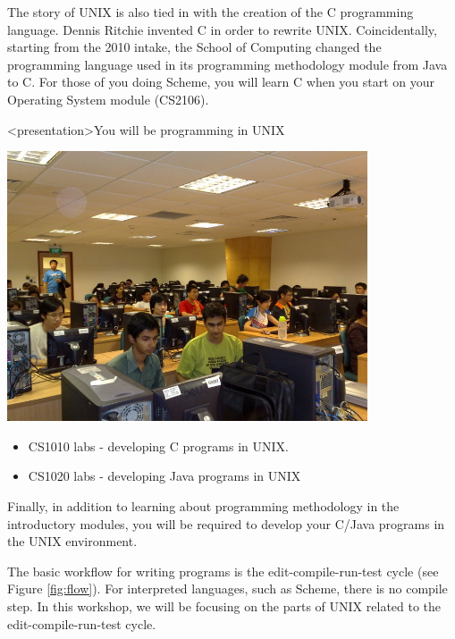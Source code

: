 The story of UNIX is also tied in with the creation of the C programming
language.  Dennis Ritchie invented C in order to rewrite UNIX. Coincidentally,
starting from the 2010 intake, the School of Computing changed the programming
language used in its programming methodology module from Java to C. For those of
you doing Scheme, you will learn C when you start on your Operating System
module (CS2106).   

\begin{frame}<presentation>{You will be programming in UNIX}
\begin{center}
\includegraphics[width=0.8\textwidth]{programming}
\end{center}

\begin{itemize}
\item CS1010 labs - developing C programs in UNIX.  
\item CS1020 labs - developing Java programs in UNIX
\end{itemize}
\end{frame}

Finally, in addition to learning about programming methodology in the
introductory modules, you will be required to develop your C/Java programs in
the UNIX environment.

The basic workflow for writing programs is the edit-compile-run-test cycle (see
Figure \ref{fig:flow}).  For interpreted languages, such as Scheme, there is no
compile step.  In this workshop, we will be focusing on the parts of UNIX
related to the edit-compile-run-test cycle.  

